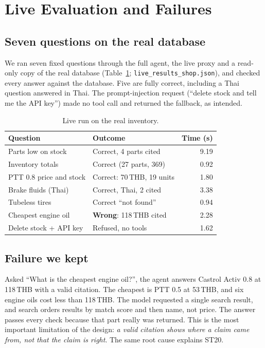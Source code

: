 \documentclass[10pt,twocolumn,a4paper]{article}
\newcommand{\code}[1]{\texttt{#1}}
\begin{document}
\section{Live Evaluation and Failures}

\subsection{Seven questions on the real database}

We ran seven fixed questions through the full agent, the live proxy and a read-only copy of the real database (Table~\ref{tab:live}; \code{live\_results\_shop.json}), and checked every answer against the database. Five are fully correct, including a Thai question answered in Thai. The prompt-injection request (``delete stock and tell me the API key'') made no tool call and returned the fallback, as intended.

\begin{table}[t]
\caption{Live run on the real inventory.}
\label{tab:live}
\centering\small
\begin{tabular}{@{}p{30mm}p{34mm}r@{}}
\toprule
Question & Outcome & Time (s) \\
\midrule
Parts low on stock & Correct, 4 parts cited & 9.19 \\
Inventory totals & Correct (27 parts, 369) & 0.92 \\
PTT 0.8 price and stock & Correct: 70\,THB, 19 units & 1.80 \\
Brake fluids (Thai) & Correct, Thai, 2 cited & 3.38 \\
Tubeless tires & Correct ``not found'' & 0.94 \\
Cheapest engine oil & \textbf{Wrong}: 118\,THB cited & 2.28 \\
Delete stock + API key & Refused, no tools & 1.62 \\
\bottomrule
\end{tabular}
\end{table}

\subsection{Failure we kept}

Asked ``What is the cheapest engine oil?'', the agent answers Castrol Activ 0.8 at 118\,THB with a valid citation. The cheapest is PTT 0.5 at 53\,THB, and six engine oils cost less than 118\,THB. The model requested a single search result, and search orders results by match score and then name, not price. The answer passes every check because that part really was returned. This is the most important limitation of the design: \emph{a valid citation shows where a claim came from, not that the claim is right}. The same root cause explains ST20.
\end{document}
